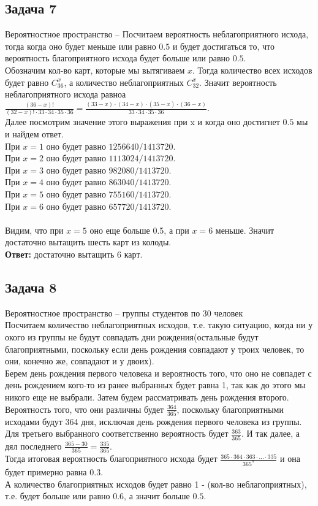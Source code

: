 	\subsection{Задача 7}
	Вероятностное пространство -- 
	Посчитаем вероятность неблагоприятного исхода, тогда когда оно будет меньше или равно $0.5$  и будет достигаться то, что вероятность благоприятного исхода будет больше или равно $0.5$. \\
	Обозначим кол-во карт, которые мы вытягиваем $x$. Тогда количество всех исходов будет равно $C_{36}^{x}$, а количество неблагоприятных $C_{32}^{x}$. Значит вероятность неблагоприятного исхода равноа $\frac{(36-x)!}{(32-x)! \cdot 33 \cdot 34 \cdot 35 \cdot 36} = \frac{(33 - x) \cdot (34 - x) \cdot (35 - x) \cdot (36 -x )}{33 \cdot 34 \cdot 35 \cdot 36}$. \\
	Далее посмотрим значение этого выражения при x и когда оно достигнет $0.5$ мы и найдем ответ. \\
	При $x = 1$ оно будет равно $1256640 / 1413720$. \\
	При $x = 2$ оно будет равно $1113024 / 1413720$. \\
	При $x = 3$ оно будет равно $982080 / 1413720$. \\
	При $x = 4$ оно будет равно $863040 / 1413720$. \\
	При $x = 5$ оно будет равно $755160 / 1413720$. \\
	При $x = 6$ оно будет равно $657720 / 1413720$. \\\\
	Видим, что при $x=5$ оно еще больше 0.5, а при $x=6$ меньше. Значит достаточно вытащить шесть карт из колоды.\\
	\textbf{Ответ:} достаточно вытащить 6 карт.
	
	\subsection{Задача 8}
	Вероятностное пространство -- группы студентов по 30 человек\\
	Посчитаем количество неблагоприятных исходов, т.е. такую ситуацию, когда ни у окого из группы не будут совпадать дни рождения(остальные будут благоприятными, поскольку если день рождения совпадают у троих человек, то они, конечно же, совпадают и у двоих). \\
	Берем день рождения первого человека и вероятность того, что оно не совпадет с день рождением кого-то из ранее выбранных будет равна 1, так как до этого мы никого еще не выбрали. Затем будем рассматривать день рождения второго. Вероятность того, что они различны будет $\frac{364}{365}$, поскольку благоприятными исходами будут 364 дня, исключая день рождения первого человека из группы. Для третьего выбранного соответственно вероятность будет $\frac{363}{365}$. И так далее, а дял последнего $\frac{365 - 30}{365} = \frac{335}{365}$. \\
	Тогда итоговая вероятность благоприятного исхода будет $\frac{365 \cdot 364 \cdot 363 \cdot \ldots \cdot 335}{365^n}$ и она будет примерно равна $0.3$. \\
	А количество благоприятных исходов будет равно 1 - (кол-во неблагоприятных), т.е. будет больше или равно $0.6$, а значит больше $0.5$.
	
